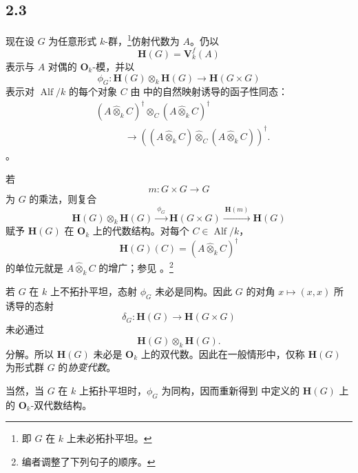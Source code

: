 \subsection*{2.3} \label{sga3:VIIB:2.3}

现在设 \(G\) 为任意形式 \(k\)-群，\footnote{\label{sga3:VIIB:nde:85}即 \(G\) 在 \(k\) 上未必拓扑平坦。}仿射代数为 \(A\)。仍以 \[
  \mathbf H(G)=\mathbf V_k^f(A)
\] 表示与 \(A\) 对偶的 \(\mathbf O_k\)-模，并以 \[
  \phi_G:
  \mathbf H(G)\otimes_k\mathbf H(G)
  \longrightarrow
  \mathbf H(G\times G)
\] 表示对 \(\operatorname{Alf}/k\) 的每个对象 \(C\) 由  中的自然映射诱导的函子性同态：\[
\begin{aligned}
  &(A\widehat\otimes_kC)^\dagger
  \otimes_C
  (A\widehat\otimes_kC)^\dagger
  \\
  &\hspace{3em}\longrightarrow
  \left(
    (A\widehat\otimes_kC)
    \widehat\otimes_C
    (A\widehat\otimes_kC)
  \right)^\dagger.
\end{aligned}
\]。

若 \[
  m:G\times G\longrightarrow G
\] 为 \(G\) 的乘法，则复合 \[
  \mathbf H(G)\otimes_k\mathbf H(G)
  \xrightarrow{\ \phi_G\ }
  \mathbf H(G\times G)
  \xrightarrow{\ \mathbf H(m)\ }
  \mathbf H(G)
\] 赋予 \(\mathbf H(G)\) 在 \(\mathbf O_k\) 上的代数结构。对每个 \(C\in\operatorname{Alf}/k\)，\[
  \mathbf H(G)(C)
  =
  (A\widehat\otimes_kC)^\dagger
\] 的单位元就是 \(A\widehat\otimes_kC\) 的增广；参见 。\footnote{\label{sga3:VIIB:nde:86}编者调整了下列句子的顺序。}

若 \(G\) 在 \(k\) 上不拓扑平坦，态射 \(\phi_G\) 未必是同构。因此 \(G\) 的对角 \(x\mapsto(x,x)\) 所诱导的态射 \[
  \delta_G:
  \mathbf H(G)\longrightarrow\mathbf H(G\times G)
\] 未必通过 \[
  \mathbf H(G)\otimes_k\mathbf H(G).
\] 分解。所以 \(\mathbf H(G)\) 未必是 \(\mathbf O_k\) 上的双代数。因此在一般情形中，仅称 \(\mathbf H(G)\) 为形式群 \(G\) 的\emph{协变代数}。

当然，当 \(G\) 在 \(k\) 上拓扑平坦时，\(\phi_G\) 为同构，因而重新得到  中定义的 \(\mathbf H(G)\) 上的 \(\mathbf O_k\)-双代数结构。
